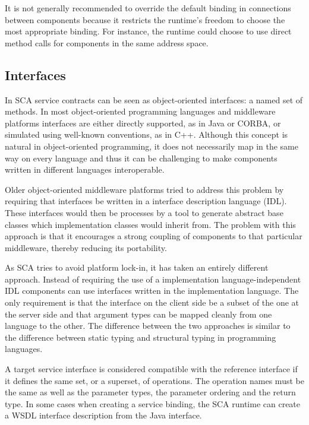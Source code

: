 It is not generally recommended to override the default binding in connections between components because it restricts
the runtime's freedom to choose the most appropriate binding. For instance, the runtime could choose to use direct method
calls for components in the same address space.

\subsection{Interfaces}
In SCA service contracts can be seen as object-oriented interfaces: a named set of methods. In most object-oriented programming
languages and middleware platforms interfaces are either directly supported, as in Java or CORBA, or simulated using well-known
conventions, as in C++. Although this concept is natural in object-oriented programming, it does not necessarily map in the same
way on every language and thus it can be challenging to make components written in different languages interoperable.

Older object-oriented middleware platforms tried to address this problem by requiring that interfaces be written in a
interface description language (IDL). These interfaces would then be processes by a tool to generate abstract base classes
which implementation classes would inherit from. The problem with this approach is that it encourages a strong coupling
of components to that particular middleware, thereby reducing its portability.

As SCA tries to avoid platform lock-in, it has taken an entirely different approach. Instead of requiring the use
of a implementation language-independent IDL components can use interfaces written in the implementation language.
The only requirement is that the interface on the client side be a subset of the one at the server side and that
argument types can be mapped cleanly from one language to the other. The difference between the two approaches is
similar to the difference between static typing and structural typing in programming languages.

A target service interface is considered compatible with the reference interface if it defines the same set, or a superset,
of operations. The operation names must be the same as well as the parameter types, the parameter ordering and the return
type.
In some cases when creating a service binding, the SCA runtime can create a WSDL interface description from the Java interface.


